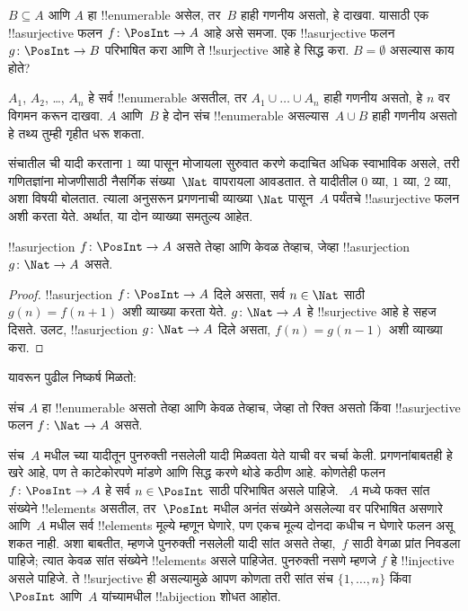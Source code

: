 \documentclass[../../../include/open-logic-section]{subfiles}
\begin{document}
\begin{prob}
  $B \subseteq A$ आणि $A$ हा !!{enumerable} असेल, तर~$B$ हाही
  गणनीय असतो, हे दाखवा. यासाठी एक !!a{surjective} फलन
  $f\colon \PosInt \to A$ आहे असे समजा. एक !!a{surjective}
  फलन~$g\colon \PosInt \to B$ परिभाषित करा आणि ते
  !!{surjective} आहे हे सिद्ध करा. $B = \emptyset$ असल्यास काय होते?
\end{prob}

\begin{prob}
  $A_1$, $A_2$, \dots, $A_n$ हे सर्व !!{enumerable} असतील, तर
  $A_1 \cup \dots \cup A_n$ हाही गणनीय असतो, हे
  $n$ वर विगमन करून दाखवा. $A$ आणि~$B$ हे दोन संच
  !!{enumerable} असल्यास~$A \cup B$ हाही गणनीय असतो
  हे तथ्य तुम्ही गृहीत धरू शकता.
\end{prob}

संचातील ची यादी करताना $1$ व्या पासून
मोजायला सुरुवात करणे कदाचित अधिक स्वाभाविक असले, तरी गणितज्ञांना
मोजणीसाठी नैसर्गिक संख्या~$\Nat$ वापरायला आवडतात. ते यादीतील
$0$ व्या, $1$ व्या, $2$ व्या, अशा विषयी बोलतात.
त्याला अनुसरून प्रगणनाची व्याख्या $\Nat$ पासून~$A$ पर्यंतचे
!!a{surjective} फलन अशी करता येते. अर्थात, या दोन व्याख्या समतुल्य आहेत.

\begin{prop}
  !!a{surjection} $f\colon \PosInt \to A$ असते तेव्हा आणि
  केवळ तेव्हाच, जेव्हा !!a{surjection} $g\colon \Nat \to A$ असते.
\end{prop}

\begin{proof}
  !!a{surjection} $f\colon \PosInt \to A$ दिले असता, सर्व
  $n \in \Nat$ साठी $g(n) = f(n+1)$ अशी व्याख्या करता येते.
  $g\colon \Nat \to A$ हे !!{surjective} आहे हे सहज दिसते.
  उलट, !!a{surjection} $g\colon \Nat \to A$ दिले असता,
  $f(n) = g(n-1)$ अशी व्याख्या करा.
\end{proof}

यावरून पुढील निष्कर्ष मिळतो:

\begin{cor}
संच $A$ हा !!{enumerable} असतो तेव्हा आणि केवळ तेव्हाच, जेव्हा
तो रिक्त असतो किंवा !!a{surjective} फलन $f\colon \Nat \to A$ असते.
\end{cor}

संच~$A$ मधील च्या यादीतून पुनरुक्ती नसलेली यादी
मिळवता येते याची वर चर्चा केली. प्रगणनांबाबतही हे खरे आहे,
पण ते काटेकोरपणे मांडणे आणि सिद्ध करणे थोडे कठीण आहे. कोणतेही
फलन $f\colon \PosInt \to A$ हे सर्व $n \in \PosInt$ साठी
परिभाषित असले पाहिजे. ~$A$ मध्ये फक्त सांत संख्येने !!{element}s
असतील, तर~$\PosInt$ मधील अनंत संख्येने असलेल्या वर
परिभाषित असणारे आणि~$A$ मधील सर्व !!{element}s मूल्ये म्हणून
घेणारे, पण एकच मूल्य दोनदा कधीच न घेणारे फलन असू शकत नाही.
अशा बाबतीत, म्हणजे पुनरुक्ती नसलेली यादी सांत असते तेव्हा,~$f$
साठी वेगळा प्रांत निवडला पाहिजे; त्यात केवळ सांत संख्येने
!!{element}s असले पाहिजेत. पुनरुक्ती नसणे म्हणजे $f$ हे
!!{injective} असले पाहिजे. ते !!{surjective} ही असल्यामुळे
आपण कोणता तरी सांत संच $\{1, \dots, n\}$ किंवा $\PosInt$
आणि~$A$ यांच्यामधील !!a{bijection} शोधत आहोत.
\end{document}
